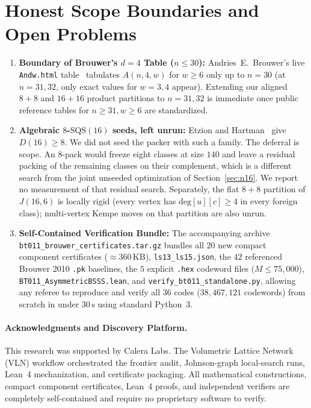 \documentclass[11pt,letterpaper]{article}
\theoremstyle{plain}
\theoremstyle{definition}
\theoremstyle{remark}
\begin{document}
\section{Honest Scope Boundaries and Open Problems}
\label{sec:scope}

\begin{enumerate}[leftmargin=1.5em,itemsep=2pt]
    \item \textbf{Boundary of Brouwer's $d = 4$ Table ($n \le 30$):} Andries~E.\ Brouwer's live \texttt{Andw.html} table~\cite{BrouwerAndw} tabulates $A(n, 4, w)$ for $w \ge 6$ only up to $n = 30$ (at $n = 31, 32$, only exact values for $w = 3, 4$ appear). Extending our aligned $8{+}8$ and $16{+}16$ product partitions to $n = 31, 32$ is immediate once public reference tables for $n \ge 31, w \ge 6$ are standardized.
    \item \textbf{Algebraic $8$-$\mathrm{SQS}(16)$ seeds, left unrun:} Etzion and Hartman~\cite{EtzionHartman1991} give $D(16) \ge 8$. We did not seed the packer with such a family. The deferral is scope. An $8$-pack would freeze eight classes at size $140$ and leave a residual packing of the remaining classes on their complement, which is a different search from the joint unseeded optimization of Section~\ref{sec:n16}. We report no measurement of that residual search. Separately, the flat $8{+}8$ partition of $J(16, 6)$ is locally rigid (every vertex has $\mathrm{deg}[u][c] \ge 4$ in every foreign class); multi-vertex Kempe moves on that partition are also unrun.
    \item \textbf{Self-Contained Verification Bundle:} The accompanying archive \texttt{bt011\_\allowbreak brouwer\_\allowbreak certificates.\allowbreak tar.gz} bundles all $20$ new compact component certificates ($\approx 360\,\mathrm{KB}$), \texttt{ls13\_\allowbreak ls15.json}, the $42$ referenced Brouwer 2010 \texttt{.pk} baselines, the $5$ explicit \texttt{.hex} codeword files ($M \le 75{,}000$), \texttt{BT011\_\allowbreak AsymmetricBSSS.lean}, and \texttt{verify\_\allowbreak bt011\_\allowbreak standalone.py}, allowing any referee to reproduce and verify all $36$ codes ($38{,}467{,}121$ codewords) from scratch in under $30\,\mathrm{s}$ using standard Python~3.
\end{enumerate}

\paragraph{Acknowledgments and Discovery Platform.}
This research was supported by Calera Labs. The Volumetric Lattice Network (VLN) workflow orchestrated the frontier audit, Johnson-graph local-search runs, Lean~4 mechanization, and certificate packaging. All mathematical constructions, compact component certificates, Lean~4 proofs, and independent verifiers are completely self-contained and require no proprietary software to verify.

{\small


}
\end{document}
